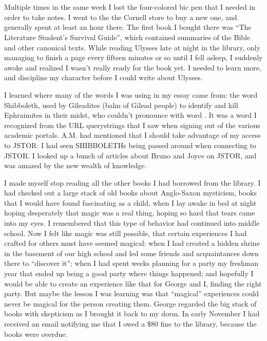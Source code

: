 \section{}

Multiple times in the same week I lost the four-colored bic pen that I needed in
order to take notes.  I went to the the Cornell store to buy a new one, and
generally spent at least an hour there.  The first book I bought there was ``The
Literature Student's Survival Guide'', which contained summaries of the Bible
and other canonical texts.  While reading Ulysses late at night in the library,
only managing to finish a page every fifteen minutes or so until I fell asleep,
I suddenly awoke and realized I wasn't really ready for the book yet.  I needed
to learn more, and discipline my character before I could write about Ulysses.  

I learned where many of the words I was using in my essay came from: the word
Shibboleth, used by Gileadites (balm of Gilead people) to identify and kill
Ephraimites in their midst, who couldn't pronounce with word .
It was a word I recognized from the URL querystrings that I saw when signing out
of the various academic portals.  A.M. had mentioned that I should take
advantage of my access to JSTOR: I had seen SHIBBOLETHs being passed around when
connecting to JSTOR.  I looked up a bunch of articles about Bruno and Joyce on
JSTOR, and was amazed by the new wealth of knowledge.

I made myself stop reading all the other books I had borrowed from the library.
I had checked out a large stack of old books about Anglo-Saxon mysticism, books
that I would have found fascinating as a child, when I lay awake in bed at night
hoping desperately that magic was a real thing, hoping so hard that tears came
into my eyes.  I remembered that this type of behavior had continued into middle
school.  Now I felt like magic was still possible, that certain experiences I
had crafted for others must have seemed magical: when I had created a hidden
shrine in the basement of our high school and led some friends and acquaintances
down there to ``discover it''; when I had spent weeks planning for a party my
freshman year that ended up being a good party where things happened; and
hopefully I would be able to create an experience like that for George and I,
finding the right party.  But maybe the lesson I was learning was that
``magical'' experiences could never be magical for the person creating them.
George regarded the big stack of books with skepticism as I brought it back to
my dorm.  In early November I had received an email notifying me that I owed a
\$80 fine to the library, because the books were overdue.

